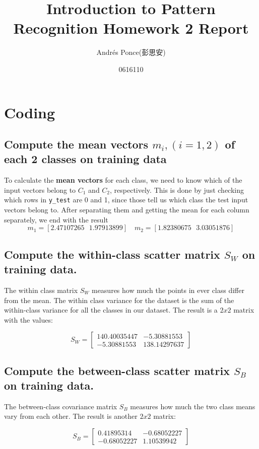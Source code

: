 \documentclass{article}
\title{Introduction to Pattern Recognition Homework 2 Report}
\author{Andr\'es Ponce(彭思安) \\
\and
0616110}
\begin{document}
\maketitle
\section{Coding}
	\subsection{Compute the mean vectors $m_{i},(i=1,2)$ of each 2 classes on training data}
		To calculate the \textbf{mean vectors} for each class, we need to know which of the 
		input vectors belong to $C_{1}$ and $C_{2}$, respectively. This is done by just checking
		which rows in \texttt{y\_test} are 0 and 1, since those tell us which class the test input
		vectors belong to. After separating them and getting the mean for each column separately,
		we end with the result
		\[ m_{1} = [2.47107265 \textrm{ } 1.97913899]\quad m_{2} = [1.82380675 \textrm{ } 3.03051876]\]
	\subsection{Compute the within-class scatter matrix $S_{W}$ on training data.}
		The within class matrix $S_{W}$ measures how much the points in ever class differ from the mean.
		The within class variance for the dataset is the sum of the within-class variance for all the classes
		in our dataset. The result is a $2x2$ matrix with the values:

		\begin{equation*}
			S_{W} = 
			\begin{bmatrix}
				140.40035447 & -5.30881553\\
				-5.30881553 & 138.14297637
			\end{bmatrix}
		\end{equation*}
	\subsection{Compute the between-class scatter matrix $S_{B}$ on training data.}
		The between-class covariance matrix $S_{B}$ measures how much the two class means
		vary from each other. The result is another $2x2$ matrix:

		\begin{equation*}
			S_{B} = 
			\begin{bmatrix}
				0.41895314 & -0.68052227\\
				-0.68052227 &  1.10539942
			\end{bmatrix}
		\end{equation*}
\end{document}
